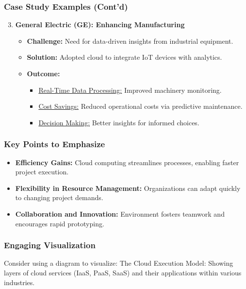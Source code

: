 \documentclass[aspectratio=169]{beamer}
\begin{document}
\begin{frame}[fragile]
    \frametitle{Case Study Examples (Cont'd)}
    \begin{enumerate}
        \setcounter{enumi}{2} %
        \item \textbf{General Electric (GE): Enhancing Manufacturing}
        \begin{itemize}
            \item \textbf{Challenge:} Need for data-driven insights from industrial equipment.
            \item \textbf{Solution:} Adopted cloud to integrate IoT devices with analytics.
            \item \textbf{Outcome:}
            \begin{itemize}
                \item \underline{Real-Time Data Processing:} Improved machinery monitoring.
                \item \underline{Cost Savings:} Reduced operational costs via predictive maintenance.
                \item \underline{Decision Making:} Better insights for informed choices.
            \end{itemize}
        \end{itemize}
    \end{enumerate}
\end{frame}

\begin{frame}[fragile]
    \frametitle{Key Points to Emphasize}
    \begin{itemize}
        \item \textbf{Efficiency Gains:} Cloud computing streamlines processes, enabling faster project execution.
        \item \textbf{Flexibility in Resource Management:} Organizations can adapt quickly to changing project demands.
        \item \textbf{Collaboration and Innovation:} Environment fosters teamwork and encourages rapid prototyping.
    \end{itemize}
\end{frame}

\begin{frame}[fragile]
    \frametitle{Engaging Visualization}
    \begin{block}{Consider using a diagram to visualize:}
        The Cloud Execution Model: Showing layers of cloud services (IaaS, PaaS, SaaS) and their applications within various industries.
    \end{block}
\end{frame}
\end{document}
